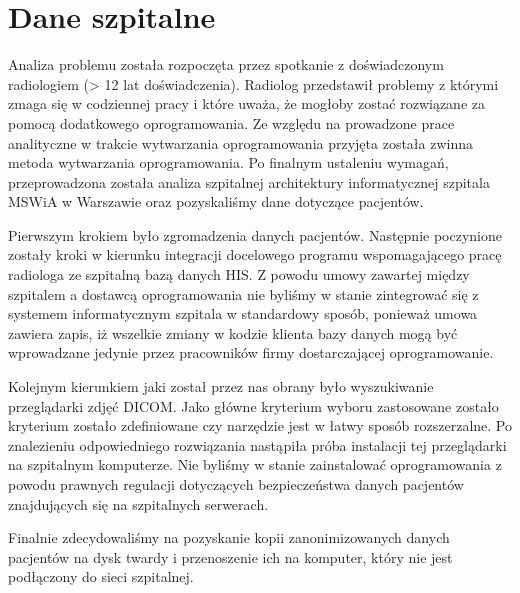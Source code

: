 \documentclass[a4paper,11pt,twoside]{report}
\theoremstyle{definition}
\begin{document}
\chapter{Dane szpitalne}
Analiza problemu została rozpoczęta przez spotkanie z doświadczonym radiologiem (> 12 lat doświadczenia). Radiolog przedstawił problemy z którymi zmaga się w codziennej pracy i które uważa, że mogłoby zostać rozwiązane za pomocą dodatkowego oprogramowania. Ze względu na prowadzone prace analityczne w trakcie wytwarzania oprogramowania przyjęta została zwinna metoda wytwarzania oprogramowania. Po finalnym ustaleniu wymagań, przeprowadzona została analiza szpitalnej architektury informatycznej szpitala MSWiA w Warszawie oraz pozyskaliśmy dane dotyczące pacjentów. 
\par
Pierwszym krokiem było zgromadzenia danych pacjentów. Następnie poczynione zostały kroki w kierunku integracji docelowego programu wspomagającego pracę radiologa ze szpitalną bazą danych HIS. Z powodu umowy zawartej między szpitalem a dostawcą oprogramowania nie byliśmy w stanie zintegrować się z systemem informatycznym szpitala w standardowy sposób, ponieważ umowa zawiera zapis, iż wszelkie zmiany w kodzie klienta bazy danych mogą być wprowadzane jedynie przez pracowników firmy dostarczającej oprogramowanie.
\par
Kolejnym kierunkiem jaki został przez nas obrany było wyszukiwanie przeglądarki zdjęć DICOM. Jako główne kryterium wyboru zastosowane zostało kryterium zostało zdefiniowane czy narzędzie jest w łatwy sposób rozszerzalne. Po znalezieniu odpowiedniego rozwiązania nastąpiła próba instalacji tej przeglądarki na szpitalnym komputerze. Nie byliśmy w stanie zainstalować oprogramowania z powodu prawnych regulacji dotyczących bezpieczeństwa danych pacjentów znajdujących się na szpitalnych serwerach.
\par
Finalnie zdecydowaliśmy na pozyskanie kopii zanonimizowanych danych pacjentów na dysk twardy i przenoszenie ich na komputer, który nie jest podłączony do sieci szpitalnej. 
\end{document}
